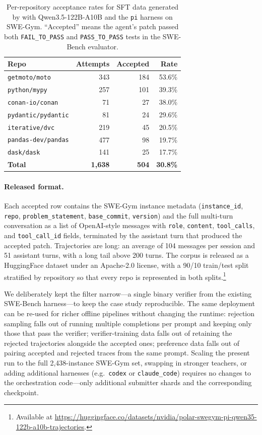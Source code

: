 \begin{table}[t]
\centering\small
\begin{tabular}{lrrr}
\toprule
\textbf{Repo} & \textbf{Attempts} & \textbf{Accepted} & \textbf{Rate} \\
\midrule
\texttt{getmoto/moto}      & 343 & 184 & 53.6\% \\
\texttt{python/mypy}       & 257 & 101 & 39.3\% \\
\texttt{conan-io/conan}    &  71 &  27 & 38.0\% \\
\texttt{pydantic/pydantic} &  81 &  24 & 29.6\% \\
\texttt{iterative/dvc}     & 219 &  45 & 20.5\% \\
\texttt{pandas-dev/pandas} & 477 &  98 & 19.7\% \\
\texttt{dask/dask}         & 141 &  25 & 17.7\% \\
\midrule
\textbf{Total}             & \textbf{1{,}638} & \textbf{504} & \textbf{30.8\%} \\
\bottomrule
\end{tabular}
\caption{Per-repository acceptance rates for SFT data generated by \polar with
Qwen3.5-122B-A10B and the \texttt{pi} harness on SWE-Gym. ``Accepted'' means
the agent's patch passed both \texttt{FAIL\_TO\_PASS} and \texttt{PASS\_TO\_PASS}
tests in the SWE-Bench evaluator.}
\label{tab:swegym-pi-rates}
\end{table}

\paragraph{Released format.}
Each accepted row contains the SWE-Gym instance metadata
(\texttt{instance\_id}, \texttt{repo}, \texttt{problem\_statement},
\texttt{base\_commit}, \texttt{version}) and the full multi-turn conversation
as a list of OpenAI-style messages with \texttt{role}, \texttt{content},
\texttt{tool\_calls}, and \texttt{tool\_call\_id} fields, terminated by the
assistant turn that produced the accepted patch. Trajectories are long: an
average of 104 messages per session and 51 assistant turns, with a long tail
above 200 turns. The corpus is released as a HuggingFace dataset under an
Apache-2.0 license, with a 90/10 train/test split stratified by repository so
that every repo is represented in both splits.\footnote{Available at
\url{https://huggingface.co/datasets/nvidia/polar-swegym-pi-qwen35-122b-a10b-trajectories}.}

We deliberately kept the filter narrow---a single binary verifier from the
existing SWE-Bench harness---to keep the case study reproducible. The same
\polar deployment can be re-used for richer offline pipelines without changing
the runtime: rejection sampling falls out of running multiple completions per
prompt and keeping only those that pass the verifier; verifier-training data
falls out of retaining the rejected trajectories alongside the accepted ones;
preference data falls out of pairing accepted and rejected traces from the
same prompt. Scaling the present run to the full 2{,}438-instance SWE-Gym set,
swapping in stronger teachers, or adding additional harnesses (e.g.\
\texttt{codex} or \texttt{claude\_code}) requires no changes to the
orchestration code---only additional submitter shards and the corresponding
checkpoint.
